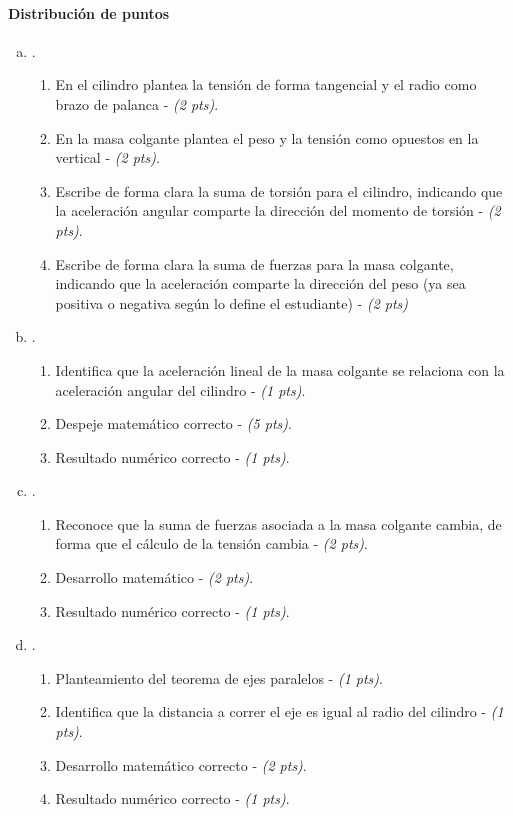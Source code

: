 \documentclass[
  12pt,
]{article}
\newcommand{\pts}[1]{ {\it (#1 pts)}}
\begin{document}
\begin{enumerate}[a)]
  \paragraph{Distribución de puntos}
  \renewcommand{\labelenumiv}{\theenumi\theenumiii-\arabic{enumiv})}
  \begin{enumerate}[a)]
      \item .
    \begin{enumerate}
    \item En el cilindro plantea la tensión de forma 
      tangencial y el radio como brazo de palanca - \pts{2}.
    \item En la masa colgante plantea el peso y la tensión
      como opuestos en la vertical - \pts{2}.
    \item Escribe de forma clara la suma de torsión para 
      el cilindro, indicando que la aceleración angular 
      comparte la dirección del momento de torsión - \pts{2}.
    \item Escribe de forma clara la suma de fuerzas para 
      la masa colgante, indicando que la aceleración
      comparte la dirección del peso (ya sea positiva
      o negativa según lo define el estudiante) - \pts{2}
    \end{enumerate}
      \item .
    \begin{enumerate}
      \item Identifica que la aceleración lineal de la
        masa colgante se relaciona con la aceleración
        angular del cilindro - \pts{1}.
      \item Despeje matemático correcto - \pts{5}.
      \item Resultado numérico correcto - \pts{1}.
    \end{enumerate}
      \item .
    \begin{enumerate}
      \item Reconoce que la suma de fuerzas asociada a la
        masa colgante cambia, de forma que el cálculo
        de la tensión cambia - \pts{2}.
      \item Desarrollo matemático - \pts{2}.
      \item Resultado numérico correcto - \pts{1}.
    \end{enumerate}
      \item .
    \begin{enumerate}
      \item Planteamiento del teorema de ejes paralelos
        - \pts{1}.
      \item Identifica que la distancia a correr el eje es
        igual al radio del cilindro - \pts{1}.
      \item Desarrollo matemático correcto - \pts{2}.
      \item Resultado numérico correcto - \pts{1}.
    \end{enumerate}
  \end{enumerate}
\end{enumerate}
\end{document}
